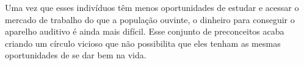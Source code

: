 



\begin{citacao}
    Uma vez que esses indivíduos têm menos oportunidades de estudar e acessar o mercado de trabalho do que a população ouvinte, o dinheiro para conseguir o aparelho auditivo é ainda mais difícil. Esse conjunto de preconceitos acaba criando um círculo vicioso que não possibilita que eles tenham as mesmas oportunidades de se dar bem na vida.~\cite{ebc-2019-10-milhoes-pessoas}
\end{citacao}


